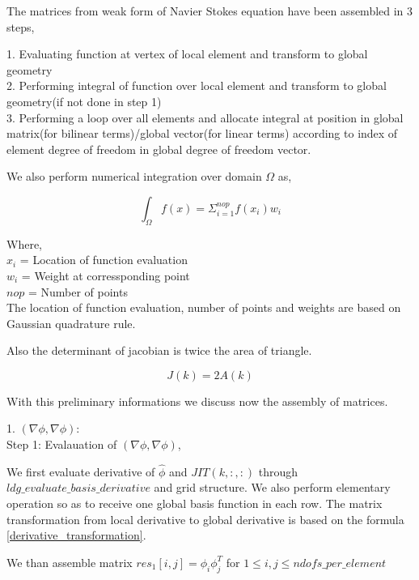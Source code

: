 \documentclass[a4paper,12pt]{book}
\begin{document}
The matrices from weak form of Navier Stokes equation have been assembled in 3 steps,

1. Evaluating function at vertex of local element and transform to global geometry\\
2. Performing integral of function over local element and transform to global geometry(if not done in step 1)\\
3. Performing a loop over all elements and allocate integral at position in global matrix(for bilinear terms)/global vector(for linear terms) according to index of element degree of freedom in global degree of freedom vector.

We also perform numerical integration over domain $\Omega$ as,

\begin{equation}\label{numerical integration}
\int_{\Omega} f(x) = \Sigma_{i=1}^{nop} f(x_i) w_i
\end{equation}

Where, \\

$x_i$ = Location of function evaluation\\
$w_i$ = Weight at corressponding point\\
$nop$ = Number of points\\

The location of function evaluation, number of points and weights are based on Gaussian quadrature rule.

Also the determinant of jacobian is twice the area of triangle.

\begin{equation}\label{determinant to area}
J(k) = 2A(k)
\end{equation}

With this preliminary informations we discuss now the assembly of matrices.

1. $(\nabla \phi, \nabla \phi)$:\\

Step 1: Evalauation of $(\nabla \phi , \nabla \phi)$,

We first evaluate derivative of $\hat{\phi}$ and $JIT(k,:,:)$ through $ldg\_evaluate\_basis\_derivative$ and grid structure. We also perform elementary operation so as to receive one global basis function in each row. The matrix transformation from local derivative to global derivative is based on the formula \ref{derivative_transformation}.

We than assemble matrix $res_1[i,j]=\phi_i \phi_j^T$ for $1 \leq i,j \leq ndofs\_per\_element$\\
\end{document}

